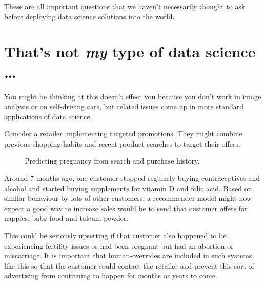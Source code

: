 \documentclass[
  letterpaper,
  DIV=11,
  numbers=noendperiod]{scrreprt}
\begin{document}
These are all important questions that we haven't necessarily thought to
ask before deploying data science solutions into the world.

\section{\texorpdfstring{That's not \emph{my} type of data science
\ldots{}}{That's not my type of data science \ldots{}}}\label{thats-not-my-type-of-data-science}

You might be thinking at this doesn't effect you because you don't work
in image analysis or on self-driving cars, but related issues come up in
more standard applications of data science.

Consider a retailer implementing targeted promotions. They might combine
previous shopping habits and recent product searches to target their
offers.

\begin{figure}


\caption{\label{fig-pregnancy-prediction}Predicting pregnancy from
search and purchase history.}

\end{figure}%

Around 7 months ago, one customer stopped regularly buying
contraceptives and alcohol and started buying supplements for vitamin D
and folic acid. Based on similar behaviour by lots of other customers, a
recommender model might now expect a good way to increase sales would be
to send that customer offers for nappies, baby food and talcum powder.

This could be seriously upsetting if that customer also happened to be
experiencing fertility issues or had been pregnant but had an abortion
or miscarriage. It is important that human-overrides are included in
such systems like this so that the customer could contact the retailer
and prevent this sort of advertising from continuing to happen for
months or years to come.
\end{document}
